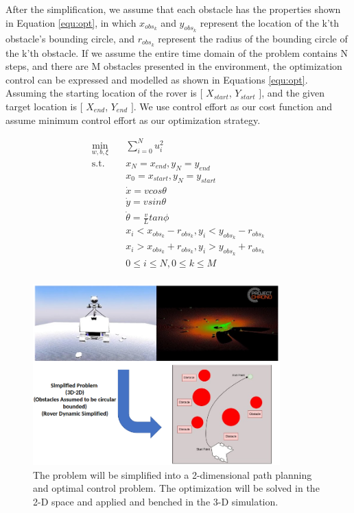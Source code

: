\documentclass{article}
\begin{document}
After the simplification, we assume that each obstacle has the properties shown in Equation \ref{equ:opt}, in which \(x_{obs_{k}}\) and \(y_{obs_{k}}\) represent the location of the k'th obstacle's bounding circle, and \(r_{obs_{k}}\) represent the radius of the bounding circle of the k'th obstacle. If we assume the entire time domain of the problem contains N steps, and there are M obstacles presented in the environment, the optimization control can be expressed and modelled as shown in Equations \ref{equ:opt}. Assuming the starting location of the rover is \([\) \(X_{start}\), \(Y_{start}\) \(]\), and the given target location is \([\) \(X_{end}\), \(Y_{end}\) \(]\). We use control effort as our cost function and assume minimum control effort as our optimization strategy.

\begin{equation}
\label{equ:opt}
\begin{aligned}
\min_{w,b,\xi} \quad & \sum_{i=0}^{N}{u_{i}^2}\\
\textrm{s.t.} \quad & x_{N} = x_{end}, y_{N} = y_{end} \\
    & x_{0} = x_{start}, y_{N} = y_{start} \\
    &    \dot{x}=vcos\theta  \\
    & \dot{y}=vsin\theta  \\
    & \dot{\theta} = \frac{v}{L}tan\phi \\
  &x_{i} < x_{obs_{k}}-r_{obs_{k}}, y_{i} < y_{obs_{k}}-r_{obs_{k}}    \\
  &x_{i} > x_{obs_{k}}+r_{obs_{k}}, y_{i} > y_{obs_{k}}+r_{obs_{k}}   \\
  & 0 \leq i \leq N, 0 \leq k \leq M \\
\end{aligned}
\end{equation}
 

\begin{figure}
\centering
    \label{fig:rover_path}
    \includegraphics[width=0.85\textwidth]{Images/rover_path.png}
    \caption{The problem will be simplified into a 2-dimensional path planning and optimal control problem. The optimization will be solved in the 2-D space and applied and benched in the 3-D simulation.}
\end{figure}
\end{document}
